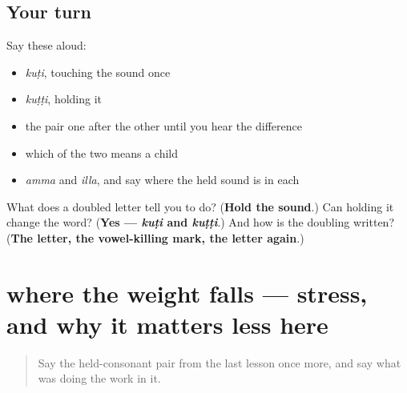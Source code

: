 \subsection*{Your turn}
Say these aloud:

\begin{itemize}
\raggedright
  \item \emph{kuṭi}, touching the sound once
  \item \emph{kuṭṭi}, holding it
  \item the pair one after the other until you hear the difference
  \item which of the two means a child
  \item \emph{amma} and \emph{illa}, and say where the held sound is in each
\end{itemize}

\begin{tcolorbox}[breakable,colback=teal!4,colframe=teal!35!black,title={Before you move on}]
What does a doubled letter tell you to do? (\textbf{Hold the sound}.) Can holding it change the word? (\textbf{Yes — \emph{kuṭi} and \emph{kuṭṭi}}.) And how is the doubling written? (\textbf{The letter, the vowel-killing mark, the letter again}.)
\end{tcolorbox}
\section[where the weight falls]{where the weight falls — stress, and why it matters less here}

\label{lesson:ML-C85-stress}



\begin{quote}
Say the held-consonant pair from the last lesson once more, and say what was doing the work in it.
\end{quote}

